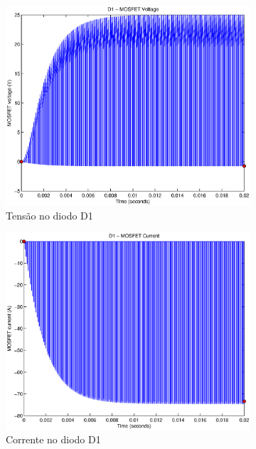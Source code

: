 \documentclass{article}
\begin{document}
\begin{figure}[H]
	\centering
	\begin{subfigure}[b]{0.4\linewidth}
		\includegraphics[width=\linewidth]{matlab/boost/r_d1v}
		\caption{Tensão no diodo D1}
	\end{subfigure}
	\begin{subfigure}[b]{0.4\linewidth}
		\centering
		\includegraphics[width=\linewidth]{matlab/boost/r_d1i}
		\caption{Corrente no diodo D1}
	\end{subfigure}
		\begin{subfigure}[b]{0.4\linewidth}

\end{subfigure}
\end{figure}
\end{document}
